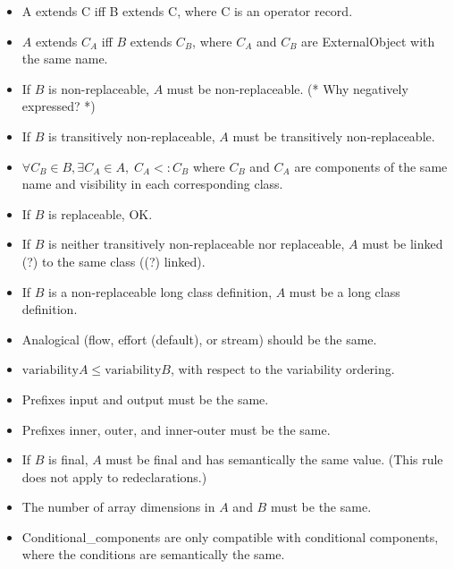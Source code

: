 \documentclass[10pt,b5paper]{article}
\begin{document}
\begin{itemize}

\item A extends C iff B extends C, where C is an operator record.

\item $A$ extends $C_A$ iff $B$ extends $C_B$, where $C_A$ and $C_B$
are ExternalObject with the same name.

\item If $B$ is non-replaceable, $A$ must be non-replaceable.  (* Why
negatively expressed? *)

\item If $B$ is transitively non-replaceable, $A$ must be transitively
non-replaceable.

\item $\forall C_B \in B, \exists C_A \in A,\; C_A <: C_B$ where $C_B$
and $C_A$ are components of the same name and visibility in each
corresponding class.

\item If $B$ is replaceable, OK.

\item If $B$ is neither transitively non-replaceable nor replaceable,
$A$ must be linked (?) to the same class ((?) linked).

\item If $B$ is a non-replaceable long class definition, $A$ must be a
long class definition.

\item Analogical (flow, effort (default), or stream) should be the
same.

\item $\mathrm{variability} A \leq \mathrm{variability} B$, with
respect to the variability ordering.

\item Prefixes input and output must be the same.

\item Prefixes inner, outer, and inner-outer must be the same.

\item If $B$ is final, $A$ must be final and has semantically the same
value.  (This rule does not apply to redeclarations.)

\item The number of array dimensions in $A$ and $B$ must be the same.

\item Conditional_components are only compatible with conditional
components, where the conditions are semantically the same.


\end{itemize}
\end{document}
